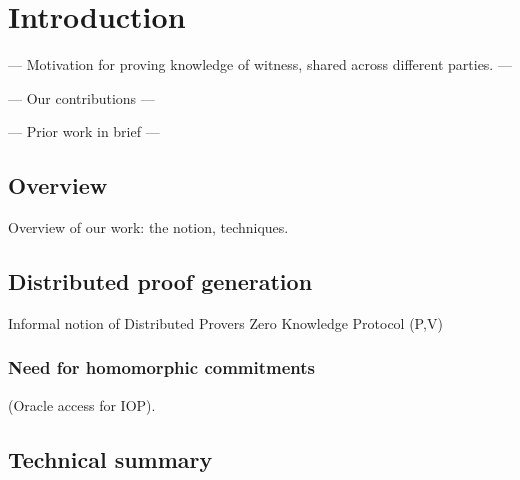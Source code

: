 \section{Introduction} \label{sec:intro}

--- Motivation for proving knowledge of witness, shared across different parties. ---

--- Our contributions ---

--- Prior work in brief ---


\subsection{Overview}
Overview of our work: the notion, techniques.

\subsection*{Distributed proof generation}
Informal notion of Distributed Provers Zero Knowledge Protocol (P,V)

\subsubsection*{Need for homomorphic commitments} 
(Oracle access for IOP).

\subsection*{Technical summary}
